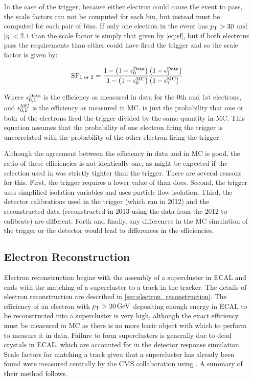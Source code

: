 In the case of the trigger, because either electron could cause the event to
pass, the scale factors can not be computed for each bin, but instead must be computed
for each pair of bins. If only one electron in the event has $p_{\mathrm{T}} > 30$ and
$|\eta| < 2.1$ than the scale factor is simply that given by \cref{eq:sf}, but if both
electrons pass the requirements than either could have fired the trigger and so
the scale factor is given by:

\begin{equation} \label{eq:sf_double}
    \text{SF}_{1 \text{ or } 2}
    =
    \frac{
        1 - \left( 1 - \epsilon^{\text{Data}}_{0} \right) \left( 1 - \epsilon^{\text{Data}}_{1} \right)
    } {
        1 - \left( 1 - \epsilon^{\text{MC}}_{0} \right) \left( 1 - \epsilon^{\text{MC}}_{1} \right)
    }
\end{equation}

Where $\epsilon^{\text{Data}}_{0,1}$ is the efficiency as measured in data for the 0th and
1st electrons, and $\epsilon^{\text{MC}}_{0,1}$ is the efficiency as measured in MC.
 is just the probability that one or both of the
electrons fired the trigger divided by the same quantity in MC. This equation
assumes that the probability of one electron firing the trigger is uncorrelated
with the probability of the other electron firing the trigger.

Although the agreement between the efficiency in data and in MC is good, the
ratio of these efficiencies is not identically one, as might be expected if the
selection used in \TnP was strictly tighter than the trigger. There are several
reasons for this. First, the trigger requires a lower value of \HOverE than
\EGTIGHT does. Second, the trigger uses simplified isolation variables and
\EGTIGHT uses particle flow isolation. Third, the detector calibrations used in
the trigger (which ran in 2012) and the reconstructed data (reconstructed in
2013 using the data from the 2012 to calibrate) are different. Forth and
finally, any differences in the MC simulation of the trigger or the detector
would lead to differences in the efficiencies.

\subsection{Electron Reconstruction}
\label{ssec:sf_reconstruction}

Electron reconstruction begins with the assembly of a supercluster in ECAL and
ends with the matching of a supercluster to a track in the tracker. The details
of electron reconstruction are described in \cref{sec:electron_reconstruction}.
The efficiency of an electron with $\pt > \SI{20}{\GeV}$ depositing enough
energy in ECAL to be reconstructed into a supercluster is very high, although
the exact efficiency must be measured in MC as there is no more basic object
with which to perform \TnP to measure it in data. Failure to form superclusters
is generally due to dead crystals in ECAL, which are accounted for in the
detector response simulation. Scale factors for matching a track given that a
supercluster has already been found were measured centrally by the CMS
collaboration using \TnP \cite{gsf_scale_factors_2013}. A summary of their
method follows.


